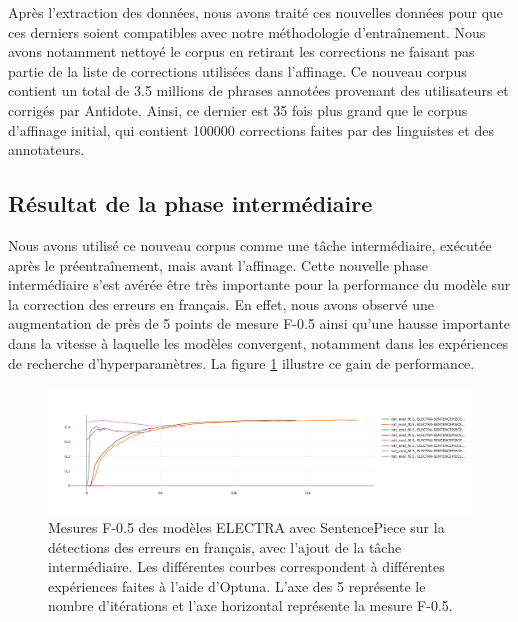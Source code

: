 \documentclass[12pt,twoside,rapport]{dms}
\theoremstyle{definition}
\numberwithin{equation}{section}
\numberwithin{table}{chapter}
\numberwithin{figure}{chapter}
\begin{document}
Après l'extraction des données, nous avons traité ces nouvelles données pour
que ces derniers soient compatibles avec notre méthodologie d'entraînement. Nous
avons notamment nettoyé le corpus en retirant les corrections ne faisant pas
partie de la liste de corrections utilisées dans l'affinage. Ce nouveau corpus
contient un total de 3.5 millions de phrases annotées provenant des utilisateurs
et corrigés par Antidote. Ainsi, ce dernier est 35 fois plus grand que le
corpus d'affinage initial, qui contient 100000 corrections faites par des
linguistes et des annotateurs.

\subsection{Résultat de la phase intermédiaire}
Nous avons utilisé ce nouveau corpus comme une tâche intermédiaire, exécutée
après le préentraînement, mais avant l'affinage. Cette nouvelle phase
intermédiaire s'est avérée être très importante pour la performance du modèle
sur la correction des erreurs en français. En effet, nous avons observé une
augmentation de près de 5 points de mesure F-0.5 ainsi qu'une hausse importante
dans la vitesse à laquelle les modèles convergent, notamment dans les
expériences de recherche d'hyperparamètres. La figure \ref{fig:electraaweb}
illustre ce gain de performance.

\begin{figure}
	\begin{center}
		\includegraphics[width=1.0\textwidth]{figures/electrasentencepieceawebf05optuna.png}
	\end{center}
	\caption{Mesures F-0.5 des modèles ELECTRA avec SentencePiece sur la détections des erreurs en français, avec l'ajout de la tâche intermédiaire. Les différentes courbes correspondent à différentes expériences faites à l'aide d'Optuna. L'axe des 5 représente le nombre d'itérations et l'axe horizontal représente la mesure F-0.5.}\label{fig:electraaweb}
\end{figure}
\end{document}
